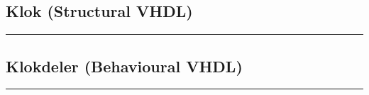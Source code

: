 \documentclass[a4paper, twoside, 10pt]{article}
\begin{document}
\newpage
\subsection{Klok (Structural VHDL)}
\label{lst: klok}

\hrule


\newpage
\subsection{Klokdeler (Behavioural VHDL)}
\label{lst: klokdeler}

\hrule

\end{document}
